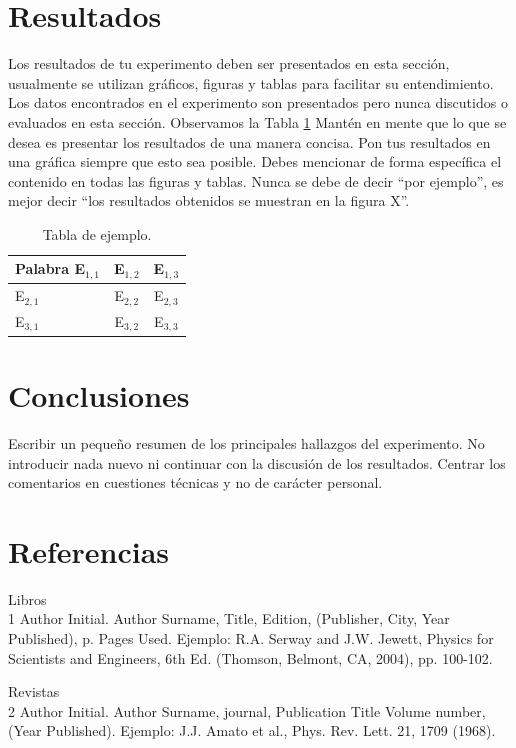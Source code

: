 \documentclass[letterpaper, 11pt]{article}
\begin{document}
\section{Resultados}
Los resultados de tu experimento deben ser presentados en esta sección, usualmente se utilizan gráficos, figuras y tablas para facilitar su entendimiento. Los datos encontrados en el experimento son presentados pero nunca discutidos o evaluados en esta sección. Observamos la Tabla \ref{tab:tabla1} Mantén en mente que lo que se desea es presentar los resultados de una manera concisa. Pon tus resultados en una gráfica siempre que esto sea posible. Debes mencionar de forma específica el contenido en todas las figuras y tablas. Nunca se debe de decir “por ejemplo”, es mejor decir “los resultados obtenidos se muestran en la figura X”.
\begin{table}
\centering
\caption{Tabla de ejemplo.}
\label{tab:tabla1}
\begin{tabular}{|l|c|c|}
\hline
Palabra E$_{1,1}$	&	E$_{1,2}$	&	E$_{1,3}$ \\ \hline
E$_{2,1}$	&	E$_{2,2}$	&	E$_{2,3}$ \\ \hline
E$_{3,1}$	&	E$_{3,2}$	&	E$_{3,3}$ \\ \hline
\end{tabular}
\end{table}

\section{Conclusiones}
Escribir un pequeño resumen de los principales hallazgos del experimento. No introducir nada nuevo ni continuar con la discusión de los resultados. Centrar los comentarios en cuestiones técnicas y no de carácter personal.

\section{Referencias}
Libros \\
1 Author Initial. Author Surname, Title, Edition, (Publisher, City, Year Published), p. Pages Used.
Ejemplo: R.A. Serway and J.W. Jewett, Physics for Scientists and Engineers, 6th Ed. (Thomson, Belmont, CA, 2004), pp. 100-102.


Revistas \\
2 Author Initial. Author Surname, journal, Publication Title Volume number, (Year Published).
Ejemplo: J.J. Amato et al., Phys. Rev. Lett. 21, 1709 (1968). 
\end{document}
